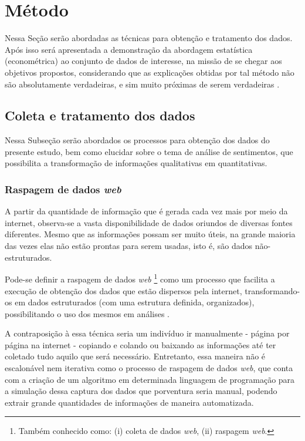 \section{Método}

Nessa Seção serão abordadas as técnicas para obtenção e tratamento dos dados. Após isso será apresentada a demonstração da abordagem estatística (econométrica) ao conjunto de dados de interesse, na missão de se chegar aos objetivos propostos, considerando que as explicações obtidas por tal método não são absolutamente verdadeiras, e sim muito próximas de serem verdadeiras \cite{gil2008metodos}.

\subsection{Coleta e tratamento dos dados}

Nessa Subseção serão abordados os processos para obtenção dos dados do presente estudo, bem como elucidar sobre o tema de análise de sentimentos, que possibilita a transformação de informações qualitativas em quantitativas.

\subsubsection{Raspagem de dados \textit{web}}

A partir da quantidade de informação que é gerada cada vez mais por meio da internet, observa-se a vasta disponibilidade de dados oriundos de diversas fontes diferentes. Mesmo que as informações possam ser muito úteis, na grande maioria das vezes elas não estão prontas para serem usadas, isto é, são dados não-estruturados.

Pode-se definir a raspagem de dados \textit{web} \footnote[2]{Também conhecido como: (i) coleta de dados \textit{web}, (ii) raspagem \textit{web}.} como um processo que facilita a execução de obtenção dos dados que estão dispersos pela internet, transformando-os em dados estruturados (com uma estrutura definida, organizados), possibilitando o uso dos mesmos em análises \cite{web_scraping2010}.

A contraposição à essa técnica seria um indivíduo ir manualmente - página por página na internet - copiando e colando ou baixando as informações até ter coletado tudo aquilo que será necessário. Entretanto, essa maneira não é escalonável nem iterativa como o processo de raspagem de dados \textit{web}, que conta com a criação de um algoritmo em determinada linguagem de programação para a simulação dessa captura dos dados que porventura seria manual, podendo extrair grande quantidades de informações de maneira automatizada.

